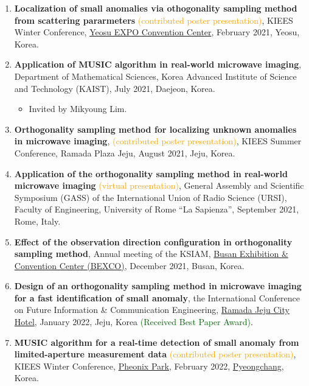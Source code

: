 \documentclass[10pt,A4]{article}
\begin{document}
\begin{enumerate}
\item\label{P-KIEES2021A} \textbf{Localization of small anomalies via othogonality sampling method from scattering pararmeters} \textcolor{orange}{(contributed poster presentation)}, KIEES Winter Conference, \href{http://www.expo2012.kr/web/bbs/content.php?co_id=sub031}{Yeosu EXPO Convention Center}, February 2021, Yeosu, Korea.
\item\label{P-KAIST2021} \textbf{Application of MUSIC algorithm in real-world microwave imaging}, Department of Mathematical Sciences, Korea Advanced Institute of Science and Technology (KAIST), July 2021, Daejeon, Korea.
\begin{itemize}
\item Invited by Mikyoung Lim.
\end{itemize}
\item\label{P-KIEES2021B} \textbf{Orthogonality sampling method for localizing unknown anomalies in microwave imaging}, \textcolor{orange}{(contributed poster presentation)}, KIEES Summer Conference, Ramada Plaza Jeju, August 2021, Jeju, Korea.
\item\label{P-URSI2021} \textbf{Application of the orthogonality sampling method in real-world microwave imaging} \textcolor{orange}{(virtual presentation)},  General Assembly and Scientific Symposium (GASS) of the International Union of Radio Science (URSI), Faculty of Engineering, University of Rome ``La Sapienza'', September 2021, Rome, Italy.
\item\label{P-KSIAM2021} \textbf{Effect of the observation direction configuration in orthogonality sampling method}, Annual meeting of the KSIAM, \href{http://www.bexco.co.kr/eng/Main.do}{Busan Exhibition \& Convention Center (BEXCO)}, December 2021, Busan, Korea.
\item\label{P-ICFICE2022} \textbf{Design of an orthogonality sampling method in microwave imaging for a fast identification of small anomaly}, the  International Conference on Future Information \& Communication Engineering, \href{http://ramadajejucity.com/index_eng.php}{Ramada Jeju City Hotel}, January 2022, Jeju, Korea \textcolor{darkgreen}{(Received Best Paper Award)}.
\item\label{P-KIEES2022A} \textbf{MUSIC algorithm for a real-time detection of small anomaly from limited-aperture measurement data} \textcolor{orange}{(contributed poster presentation)}, KIEES Winter Conference, \href{https://phoenixhnr.co.kr/en/page/main/pyeongchang}{Pheonix Park}, February 2022, \href{http://eng.pc.go.kr/}{Pyeongchang}, Korea.

\end{enumerate}
\end{document}

